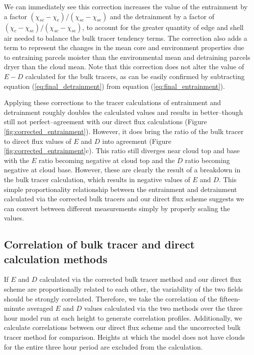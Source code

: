 \documentclass[12pt]{article}
\begin{document}
We can immediately see this correction increases the value of the entrainment 
by a factor $(\chi_{sc} - \chi_e)/(\chi_{sc} - \chi_{se})$ and the detrainment 
by a factor of $(\chi_c - \chi_{se})/(\chi_{sc} - \chi_{se})$, to account for 
the greater quantity of edge and shell air needed to balance the bulk tracer 
tendency terms.  The correction also adds a term to represent the changes in 
the mean core and environment properties due to entraining parcels moister than 
the environmental mean and detraining parcels dryer than the cloud mean.  Note 
that this correction does not alter the value of $E-D$ calculated for the bulk 
tracers, as can be easily confirmed by subtracting equation 
(\ref{eq:final_detrainment}) from equation (\ref{eq:final_entrainment}).

Applying these corrections to the tracer calculations of entrainment and 
detrainment roughly doubles the calculated values and results in better--though 
still not perfect--agreement with our direct flux calculations (Figure 
\ref{fig:corrected_entrainment}).  However, it does bring the ratio of the bulk 
tracer to direct flux values of $E$ and $D$ into agreement (Figure 
\ref{fig:corrected_entrainment}c).  This ratio still diverges near cloud top 
and base with the $E$ ratio becoming negative at cloud top and the $D$ ratio 
becoming negative at cloud base.  However, these are clearly the result of a
breakdown in the bulk tracer calculation, which results in negative values 
of $E$ and $D$.  This simple proportionality relationship between the 
entrainment and detrainment calculated via the corrected bulk tracers and our 
direct flux scheme suggests we can convert between different measurements 
simply by properly scaling the values.


\subsection{Correlation of bulk tracer and direct calculation methods}

If $E$ and $D$ calculated via the corrected bulk tracer method and our direct 
flux scheme are proportionally related to each other, the variability of the two 
fields should be strongly correlated.  Therefore, we take the correlation of 
the fifteen-minute averaged $E$ and $D$ values calculated via the two methods 
over the three hour model run at each height to generate correlation profiles.  
Additionally, we calculate correlations between our direct flux scheme and 
the uncorrected bulk tracer method for comparison.  Heights at which the model 
does not have clouds for the entire three hour period are excluded from the 
calculation.  
\end{document}
